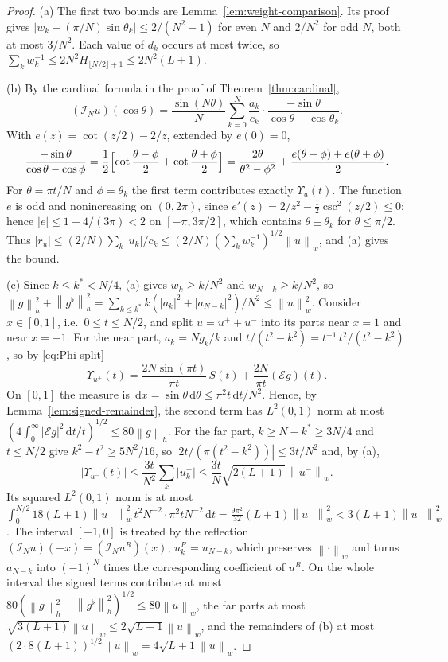 \documentclass{siamart251216}
\newcommand{\norm}[1]{\left\lVert#1\right\rVert}
\newcommand{\dd}{\,\mathrm d}
\begin{document}
\begin{proof}
(a) The first two bounds are Lemma~\ref{lem:weight-comparison}. Its proof
gives $|w_k-(\pi/N)\sin\theta_k|\le2/(N^2-1)$ for even $N$ and $2/N^2$
for odd $N$, both at most $3/N^2$. Each value of $d_k$ occurs at most
twice, so $\sum_kw_k^{-1}\le2N^2H_{\lfloor N/2\rfloor+1}\le2N^2(L+1)$.

(b) By the cardinal formula in the proof of Theorem~\ref{thm:cardinal},
\[
 (\mathcal I_Nu)(\cos\theta)=\frac{\sin(N\theta)}N\sum_{k=0}^N\frac{a_k}{c_k}
 \cdot\frac{-\sin\theta}{\cos\theta-\cos\theta_k} .
\]
With $e(z)=\cot(z/2)-2/z$, extended by $e(0)=0$,
\[
 \frac{-\sin\theta}{\cos\theta-\cos\phi}
 =\frac12\Bigl[\cot\frac{\theta-\phi}2+\cot\frac{\theta+\phi}2\Bigr]
 =\frac{2\theta}{\theta^2-\phi^2}+\frac{e(\theta-\phi)+e(\theta+\phi)}2 .
\]
For $\theta=\pi t/N$ and $\phi=\theta_k$ the first term contributes exactly
$\Upsilon_u(t)$. The function $e$ is odd and nonincreasing on $(0,2\pi)$, since
$e'(z)=2/z^2-\tfrac12\csc^2(z/2)\le0$; hence $|e|\le1+4/(3\pi)<2$ on
$[-\pi,3\pi/2]$, which contains $\theta\pm\theta_k$ for $\theta\le\pi/2$.
Thus $|r_u|\le(2/N)\sum_k|u_k|/c_k\le(2/N)(\sum_kw_k^{-1})^{1/2}\norm u_w$,
and (a) gives the bound.

(c) Since $k\le k^\ast<N/4$, (a) gives $w_k\ge k/N^2$ and
$w_{N-k}\ge k/N^2$, so
$\norm g_h^2+\norm{g^\flat}_h^2=\sum_{k\le k^\ast}k(|a_k|^2+|a_{N-k}|^2)/N^2
\le\norm u_w^2$. Consider $x\in[0,1]$, i.e.\ $0\le t\le N/2$, and split
$u=u^{+}+u^{-}$ into its parts near $x=1$ and near $x=-1$.
For the near part, $a_k=Ng_k/k$ and
$t/(t^2-k^2)=t^{-1}\,t^2/(t^2-k^2)$, so by \eqref{eq:Phi-split}
\[
 \Upsilon_{u^{+}}(t)=\frac{2N\sin(\pi t)}{\pi t}\,S(t)
 +\frac{2N}{\pi t}(\mathcal Eg)(t) .
\]
On $[0,1]$ the measure is $\dd x=\sin\theta\dd\theta\le\pi^2t\dd t/N^2$.
Hence, by Lemma~\ref{lem:signed-remainder}, the second term has
$L^2(0,1)$ norm at most
$(4\int_0^\infty|\mathcal Eg|^2\dd t/t)^{1/2}\le80\norm g_h$.
For the far part, $k\ge N-k^\ast\ge3N/4$ and $t\le N/2$ give
$k^2-t^2\ge5N^2/16$, so
$|2t/(\pi(t^2-k^2))|\le3t/N^2$ and, by (a),
\[
 |\Upsilon_{u^{-}}(t)|\le\frac{3t}{N^2}\sum_k|u^{-}_k|
 \le\frac{3t}N\sqrt{2(L+1)}\,\norm{u^{-}}_w .
\]
Its squared $L^2(0,1)$ norm is at most
$\int_0^{N/2}18(L+1)\norm{u^{-}}_w^2\,t^2N^{-2}\cdot\pi^2tN^{-2}\dd t
=\tfrac{9\pi^2}{32}(L+1)\norm{u^{-}}_w^2<3(L+1)\norm{u^{-}}_w^2$.
The interval $[-1,0]$ is treated by the reflection
$(\mathcal I_Nu)(-x)=(\mathcal I_Nu^R)(x)$, $u^R_k=u_{N-k}$, which preserves
$\norm\cdot_w$ and turns $a_{N-k}$ into $(-1)^N$ times the corresponding
coefficient of $u^R$. On the whole interval the signed terms contribute at most
$80(\norm g_h^2+\norm{g^\flat}_h^2)^{1/2}\le80\norm u_w$, the far parts at most
$\sqrt{3(L+1)}\norm u_w\le2\sqrt{L+1}\norm u_w$, and the remainders of (b)
at most $(2\cdot8(L+1))^{1/2}\norm u_w=4\sqrt{L+1}\norm u_w$.
\end{proof}
\end{document}
